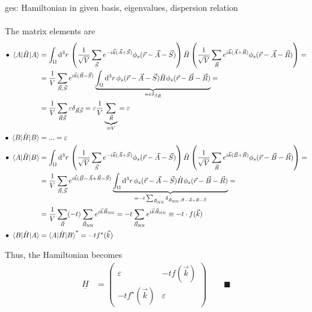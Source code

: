 \documentclass{article}
\newcommand{\diff}{\mathrm{d}}
\newcommand{\lr}[1]{\left(#1\right)}
\begin{document}
{	ges: Hamiltonian in given basis, eigenvalues, dispersion relation\\
	\\
	The matrix elements are
		\begin{align*}
			\bullet \ \braket{ A | \hat{H} | A } &= \int_\Omega \diff^3r \, \lr{ \frac{1}{\sqrt{V}} \sum_{\vec{S}} e^{-i\vec{k}(\vec{A} + \vec{S})} \phi_s(\vec{r} - \vec{A} - \vec{S}) } \hat{H} \lr{ \frac{1}{\sqrt{V}} \sum_{\vec{R}} e^{i\vec{k}(\vec{A} + \vec{R})} \phi_s(\vec{r} - \vec{A} - \vec{R}) } = \\
			&= \frac{1}{V} \sum_{\vec{R},\vec{S}} e^{i\vec{k}(\vec{R}-\vec{S})} \underbrace{ \int_\Omega \diff^3r \, \phi_s(\vec{r} - \vec{A} - \vec{S}) \hat{H} \phi_s(\vec{r} - \vec{B} - \vec{R}) }_{=\varepsilon \delta_{\vec{S}\vec{R}}} = \\
			&= \frac{1}{V} \sum_{\vec{R}\vec{S}} \varepsilon \delta_{\vec{R}\vec{S}} = \varepsilon \frac{1}{V} \underbrace{\sum_{\vec{R}}}_{=V} = \varepsilon \\
			\bullet \ \braket{ B | \hat{H} | B } &= ... = \varepsilon \\
			\bullet \ \braket{ A | \hat{H} | B } &= \int_\Omega \diff^3r \, \lr{ \frac{1}{\sqrt{V}} \sum_{\vec{S}} e^{-i\vec{k}(\vec{A} + \vec{S})} \phi_s(\vec{r} - \vec{A} - \vec{S}) } \hat{H} \lr{ \frac{1}{\sqrt{V}} \sum_{\vec{R}} e^{i\vec{k}(\vec{B} + \vec{R})} \phi_s(\vec{r} - \vec{B} - \vec{R}) } = \\
			&= \frac{1}{V} \sum_{\vec{R},\vec{S}} e^{i\vec{k}(\vec{B}-\vec{A}+\vec{R}-\vec{S})} \underbrace{ \int_\Omega \diff^3r \, \phi_s(\vec{r} - \vec{A} - \vec{S}) \hat{H} \phi_s(\vec{r} - \vec{B} - \vec{R}) }_{= -t \sum_{\vec{R}_\text{NN}} \delta_{\vec{R}_\text{NN},\vec{B}-\vec{A}+\vec{R}-\vec{S}}} = \\
			&= \frac{1}{V} \sum_{\vec{R}} (-t) \sum_{\vec{R}_\text{NN}} e^{i\vec{k}\vec{R}_\text{NN}} = -t \sum_{\vec{R}_\text{NN}} e^{i\vec{k}\vec{R}_\text{NN}} \equiv -t \cdot f(\vec{k}) \\
			\bullet \ \braket{ B | \hat{H} | A } &= \braket{ A | \hat{H} | B }^\star = -t f^\star(\vec{k})
		\end{align*}
	
	Thus, the Hamiltonian becomes
		\begin{align*}
			\underline{H} &=
			\begin{pmatrix}
				\varepsilon & -t f(\vec{k}) \\
				-t f^\star(\vec{k}) & \varepsilon
			\end{pmatrix} \qquad\blacksquare
		\end{align*}
	
}
\end{document}
